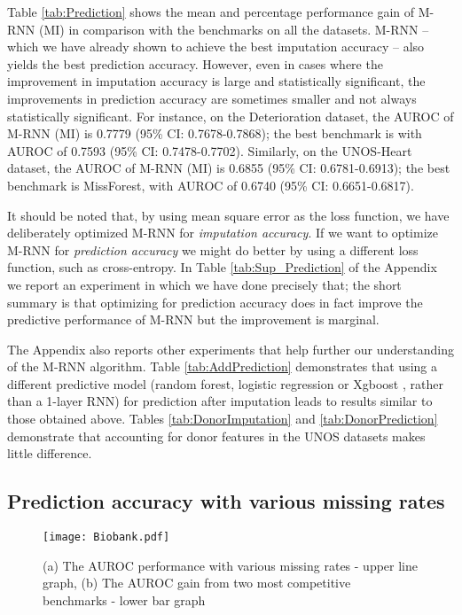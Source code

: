\documentclass{article}
\begin{document}
Table \ref{tab:Prediction} shows the mean and percentage performance gain of M-RNN (MI) in comparison with the benchmarks on all the datasets.  M-RNN -- which we have already shown to achieve the best imputation accuracy -- also yields the best prediction accuracy. However, even in cases where the improvement in imputation accuracy is large and statistically significant, the  improvements in prediction accuracy are sometimes smaller and not  always statistically significant.  For instance, on the Deterioration dataset, the AUROC of M-RNN (MI) is 0.7779 (95\% CI: 0.7678-0.7868); the best benchmark is  \cite{Recent_RNN3} with AUROC of 0.7593 (95\% CI: 0.7478-0.7702). Similarly, on the UNOS-Heart dataset, the AUROC of M-RNN (MI) is 0.6855 (95\% CI: 0.6781-0.6913); the best benchmark is MissForest, with AUROC of 0.6740 (95\% CI: 0.6651-0.6817).

It should be noted that, by using mean square error as the loss function, we have deliberately optimized M-RNN for {\em imputation accuracy}.  If we want to optimize M-RNN for {\em prediction accuracy} we might do better by using a different loss function, such as cross-entropy.  In Table \ref{tab:Sup_Prediction} of the Appendix we report an experiment in which we have done precisely that; the short summary is that optimizing for prediction accuracy does in fact improve the predictive performance of M-RNN  but the improvement is marginal.

The Appendix also reports other  experiments that help further our understanding of the M-RNN algorithm.  Table \ref{tab:AddPrediction} demonstrates that using a different predictive model (random forest, logistic regression or Xgboost \cite{xgboost}, rather than a 1-layer RNN) for prediction after imputation leads to results similar to those obtained above.  Tables \ref{tab:DonorImputation} and \ref{tab:DonorPrediction} demonstrate that accounting for donor features in the UNOS datasets makes little difference.   

\subsection{Prediction accuracy with various missing rates}

\begin{figure}[t!]
	\center
	\texttt{[image: Biobank.pdf]}
	\caption{(a) The AUROC performance with various missing rates - upper line graph, (b) The AUROC gain from two most competitive benchmarks - lower bar graph}
	\label{fig:Biobank}
\end{figure}
\end{document}
